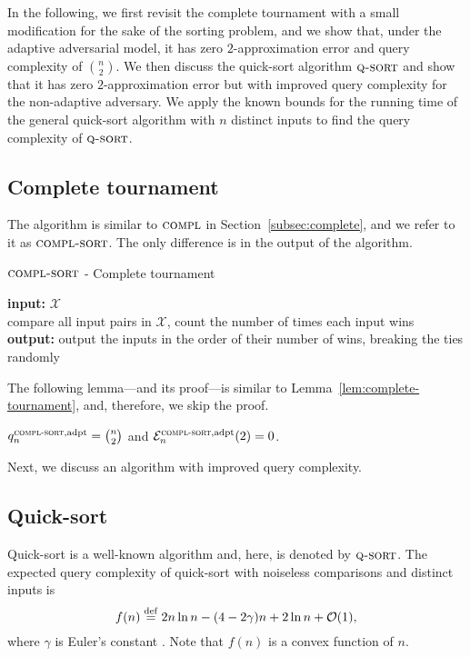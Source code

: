 \documentclass[twoside,11pt]{article}
\newcommand{\df}[1][\rm{def}]{\stackrel{#1}{=}}
\newcommand{\cO}{\mathcal{O}}
\newcommand{\cX}{\mathcal{X}}
\newcommand{\cE}{\mathcal{E}}
\newcommand{\algorithms}[1]{\textsc{#1}}
\newcommand{\algcomp}{\algorithms{compl}}
\newcommand{\algcompsort}{\algorithms{compl-sort}}
\newcommand{\algquicksort}{\algorithms{q-sort}}
\newcommand{\pe}{\cE}
\newcommand{\adaptive}{\textnormal{adpt}}
\begin{document}
In the following, we first revisit the complete tournament with a small
modification for the sake of the sorting problem, and we show that, under
the adaptive adversarial model, it has zero $2$-approximation error and
query complexity of $\binom{n}{2}$. We then discuss the quick-sort
algorithm $\algquicksort$ and show that it has zero $2$-approximation
error but with improved query complexity for the non-adaptive
adversary. We apply the known bounds for the running time of the general
quick-sort algorithm with $n$ distinct inputs to find the query
complexity of $\algquicksort$.

\subsection{Complete tournament}
The algorithm is similar to $\algcomp$ in
Section~\ref{subsec:complete}, and we refer to it as
$\algcompsort$. The only difference is in the output of the algorithm.
\begin{algorithm}
\caption{$\algcompsort$ - Complete tournament} \textbf{input:}
$\cX$\\ \qquad compare all input pairs in $\cX$, count the number of
times each input wins\\ \textbf{output:} output the inputs in the
order of their number of wins, breaking the ties randomly
\end{algorithm}

The following lemma---and its proof---is similar to
Lemma~\ref{lem:complete-tournament}, and, therefore, we skip the proof.
\begin{lemma}
 \label{lem:complete-tournamentsort}
  $q_n^{\algcompsort,\adaptive}=\binom{n}{2}$ and $\pe_n^{\algcompsort,\adaptive}(2)=0$.
\end{lemma}
Next, we discuss an algorithm with improved query complexity.

\subsection{Quick-sort}
Quick-sort is a well-known algorithm and, here, is denoted by
$\algquicksort$. The expected query complexity of quick-sort with
noiseless comparisons and distinct inputs is
\begin{equation}
\label{eqn:quicksortfinal}
  f(n)\df2n\ln n-(4-2\gamma)n+2\ln n+\cO(1),
\end{equation}
where $\gamma$ is Euler's constant \citep{McdiarmidH96}. Note that
$f(n)$ is a convex function of $n$.
\end{document}
